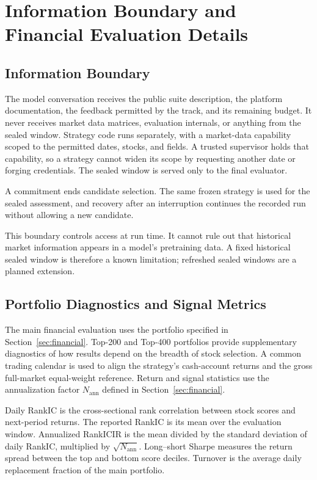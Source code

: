 \section{Information Boundary and Financial Evaluation Details}
\label{app:boundary}
\label{app:financial_details}

\subsection{Information Boundary}

The model conversation receives the public suite description, the platform documentation, the feedback permitted by the track, and its remaining budget. It never receives market data matrices, evaluation internals, or anything from the sealed window. Strategy code runs separately, with a market-data capability scoped to the permitted dates, stocks, and fields. A trusted supervisor holds that capability, so a strategy cannot widen its scope by requesting another date or forging credentials. The sealed window is served only to the final evaluator.

A commitment ends candidate selection. The same frozen strategy is used for the sealed assessment, and recovery after an interruption continues the recorded run without allowing a new candidate.

This boundary controls access at run time. It cannot rule out that historical market information appears in a model's pretraining data. A fixed historical sealed window is therefore a known limitation; refreshed sealed windows are a planned extension.

\subsection{Portfolio Diagnostics and Signal Metrics}

The main financial evaluation uses the portfolio specified in Section~\ref{sec:financial}. Top-200 and Top-400 portfolios provide supplementary diagnostics of how results depend on the breadth of stock selection. A common trading calendar is used to align the strategy's cash-account returns and the gross full-market equal-weight reference. Return and signal statistics use the annualization factor $N_{\mathrm{ann}}$ defined in Section~\ref{sec:financial}.

Daily RankIC is the cross-sectional rank correlation between stock scores and next-period returns. The reported RankIC is its mean over the evaluation window. Annualized RankICIR is the mean divided by the standard deviation of daily RankIC, multiplied by $\sqrt{N_{\mathrm{ann}}}$. Long--short Sharpe measures the return spread between the top and bottom score deciles. Turnover is the average daily replacement fraction of the main portfolio.

